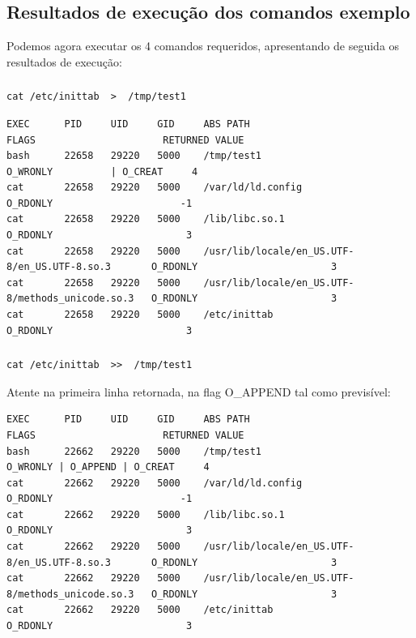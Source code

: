 \documentclass[a4paper]{article}
\begin{document}
\subsection{Resultados de execução dos comandos exemplo}
Podemos agora executar os 4 comandos requeridos, apresentando de seguida os resultados de execução:
\subsubsection{}

\begin{lstlisting}[style=command]
cat /etc/inittab  >  /tmp/test1
\end{lstlisting}

\par 
\begin{lstlisting}[style=esc]
EXEC      PID     UID     GID     ABS PATH                                          FLAGS                      RETURNED VALUE
bash      22658   29220   5000    /tmp/test1                                         O_WRONLY          | O_CREAT     4
cat       22658   29220   5000    /var/ld/ld.config                                  O_RDONLY                      -1
cat       22658   29220   5000    /lib/libc.so.1                                     O_RDONLY                       3
cat       22658   29220   5000    /usr/lib/locale/en_US.UTF-8/en_US.UTF-8.so.3       O_RDONLY                       3
cat       22658   29220   5000    /usr/lib/locale/en_US.UTF-8/methods_unicode.so.3   O_RDONLY                       3
cat       22658   29220   5000    /etc/inittab                                       O_RDONLY                       3
\end{lstlisting}

\subsubsection{}

\begin{lstlisting}[style=command]
cat /etc/inittab  >>  /tmp/test1
\end{lstlisting}
Atente na primeira linha retornada, na flag O\_APPEND tal como previsível:
\par 
\begin{lstlisting}[style=esc]
EXEC      PID     UID     GID     ABS PATH                                          FLAGS                      RETURNED VALUE
bash      22662   29220   5000    /tmp/test1                                         O_WRONLY | O_APPEND | O_CREAT     4
cat       22662   29220   5000    /var/ld/ld.config                                  O_RDONLY                      -1
cat       22662   29220   5000    /lib/libc.so.1                                     O_RDONLY                       3
cat       22662   29220   5000    /usr/lib/locale/en_US.UTF-8/en_US.UTF-8.so.3       O_RDONLY                       3
cat       22662   29220   5000    /usr/lib/locale/en_US.UTF-8/methods_unicode.so.3   O_RDONLY                       3
cat       22662   29220   5000    /etc/inittab                                       O_RDONLY                       3
\end{lstlisting}
\end{document}
